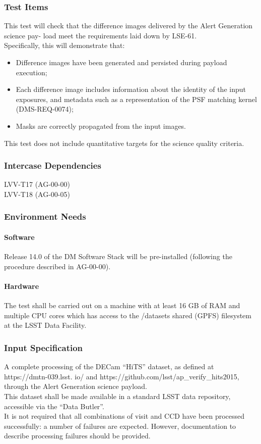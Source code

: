 \subsubsection{Test Items}
This test will check that the difference images delivered by the Alert
Generation science pay- load meet the requirements laid down by
LSE-61.\\
Specifically, this will demonstrate that:

\begin{itemize}
\tightlist
\item
  Difference images have been generated and persisted during payload
  execution;
\item
  Each difference image includes information about the identity of the
  input exposures, and metadata such as a representation of the PSF
  matching kernel (DMS-REQ-0074);
\item
  Masks are correctly propagated from the input images.
\end{itemize}

This test does not include quantitative targets for the science quality
criteria.



\subsubsection{Intercase Dependencies}
LVV-T17 (AG-00-00)\\
LVV-T18 (AG-00-05)


\subsubsection{Environment Needs}

\paragraph{Software}
Release 14.0 of the DM Software Stack will be pre-installed (following
the procedure described in AG-00-00).


\paragraph{Hardware}
The test shall be carried out on a machine with at least 16 GB of RAM
and multiple CPU cores which has access to the /datasets shared (GPFS)
filesystem at the LSST Data Facility.


\subsubsection{Input Specification}
A complete processing of the DECam ``HiTS'' dataset, as defined at
https://dmtn-039.lsst. io/ and
https://github.com/lsst/ap\_verify\_hits2015, through the Alert
Generation science payload.\\
This dataset shall be made available in a standard LSST data repository,
accessible via the ``Data Butler''.\\
It is not required that all combinations of visit and CCD have been
processed successfully: a number of failures are expected. However,
documentation to describe processing failures should be provided.


